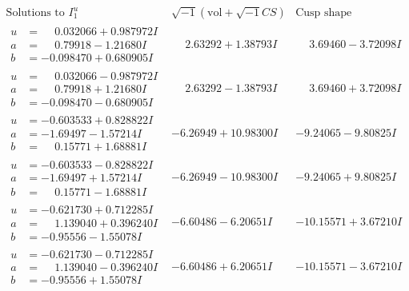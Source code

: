 \documentclass[1p]{elsarticle_modified}
\theoremstyle{definition}
\newcommand{\I}{\sqrt{-1}}
\begin{document}
$$\begin{array}{c|c|c}  
\text{Solutions to }I^u_{1}& \I (\text{vol} + \sqrt{-1}CS) & \text{Cusp shape}\\
 \hline 
\begin{aligned}
u &= \phantom{-}0.032066 + 0.987972 I \\
a &= \phantom{-}0.79918 - 1.21680 I \\
b &= -0.098470 + 0.680905 I\end{aligned}
 & \phantom{-}2.63292 + 1.38793 I & \phantom{-}3.69460 - 3.72098 I \\ \hline\begin{aligned}
u &= \phantom{-}0.032066 - 0.987972 I \\
a &= \phantom{-}0.79918 + 1.21680 I \\
b &= -0.098470 - 0.680905 I\end{aligned}
 & \phantom{-}2.63292 - 1.38793 I & \phantom{-}3.69460 + 3.72098 I \\ \hline\begin{aligned}
u &= -0.603533 + 0.828822 I \\
a &= -1.69497 - 1.57214 I \\
b &= \phantom{-}0.15771 + 1.68881 I\end{aligned}
 & -6.26949 + 10.98300 I & -9.24065 - 9.80825 I \\ \hline\begin{aligned}
u &= -0.603533 - 0.828822 I \\
a &= -1.69497 + 1.57214 I \\
b &= \phantom{-}0.15771 - 1.68881 I\end{aligned}
 & -6.26949 - 10.98300 I & -9.24065 + 9.80825 I \\ \hline\begin{aligned}
u &= -0.621730 + 0.712285 I \\
a &= \phantom{-}1.139040 + 0.396240 I \\
b &= -0.95556 - 1.55078 I\end{aligned}
 & -6.60486 - 6.20651 I & -10.15571 + 3.67210 I \\ \hline\begin{aligned}
u &= -0.621730 - 0.712285 I \\
a &= \phantom{-}1.139040 - 0.396240 I \\
b &= -0.95556 + 1.55078 I\end{aligned}
 & -6.60486 + 6.20651 I & -10.15571 - 3.67210 I \\ \hline\begin{aligned}

\end{aligned}
\end{array}$$
\end{document}

